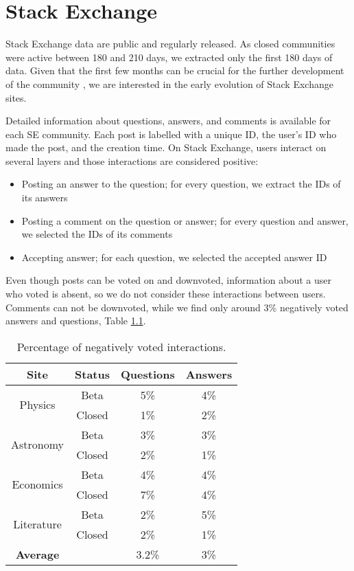 \chapter{Stack Exchange}
\label{App:SE}
Stack Exchange data are public and regularly released. As closed communities were active between 180 and 210 days, we extracted only the first 180 days of data. Given that the first few months can be crucial for the further development of the community \cite{dover2020sustainable}, we are interested in the early evolution of Stack Exchange sites. 

Detailed information about questions, answers, and comments is available for each SE community. Each post is labelled with a unique ID, the user's ID who made the post, and the creation time. On Stack Exchange, users interact on several layers and those interactions are considered positive:
\begin{itemize}
	\item Posting an answer to the question; for every question, we extract the IDs of its answers
	\item Posting a comment on the question or answer; for every question and answer, we selected the IDs of its comments
	\item Accepting answer; for each question, we selected the accepted answer ID
\end{itemize}

Even though posts can be voted on and downvoted, information about a user who voted is absent, so we do not consider these interactions between users. Comments can not be downvoted, while we find only around 3\% negatively voted answers and questions, Table \ref{tab:negint}.

\begin{table}[hbt!]
	\centering
	\caption{Percentage of negatively voted interactions.}
	\label{tab:negint}
	\begin{tabular}{cc|cc}
		
		\hline
		Site                        & Status & Questions & Answers \\ \hline
		\multirow{2}{*}{Physics}    & Beta   & 5\%       & 4\%     \\
		& Closed & 1\%       & 2\%     \\ \hline
		\multirow{2}{*}{Astronomy}  & Beta   & 3\%       & 3\%     \\
		& Closed & 2\%       & 1\%     \\ \hline
		\multirow{2}{*}{Economics}  & Beta   & 4\%       & 4\%     \\
		& Closed & 7\%       & 4\%     \\ \hline
		\multirow{2}{*}{Literature} & Beta   & 2\%       & 5\%     \\ 
		& Closed & 2\%       & 1\%     \\ \hline \hline
		\textbf{Average}            &        & 3.2\%     & 3\%     \\ \hline 
	\end{tabular}
\end{table}


